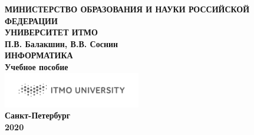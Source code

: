 \documentclass[a5paper,14pt]{report}
\begin{document}
\pagestyle{empty}
\newpage
\mbox{}
\newpage
\begin{center}
\scriptsize
\textbf {
МИНИСТЕРСТВО ОБРАЗОВАНИЯ И НАУКИ РОССИЙСКОЙ ФЕДЕРАЦИИ
\newline
\\УНИВЕРСИТЕТ ИТМО
\large
\\\vspace{4cm}
П.В. Балакшин, В.В. Соснин
\\\vspace{1cm}
\LARGE
ИНФОРМАТИКА
\Large
\\\vspace{1cm}
Учебное пособие
\\\vspace{6cm}
\includegraphics[width=6cm]{ITMO_log}
\\\vspace{0.5cm}
\normalsize
Санкт-Петербург
\\2020
}
\end{center}
\end{document}
